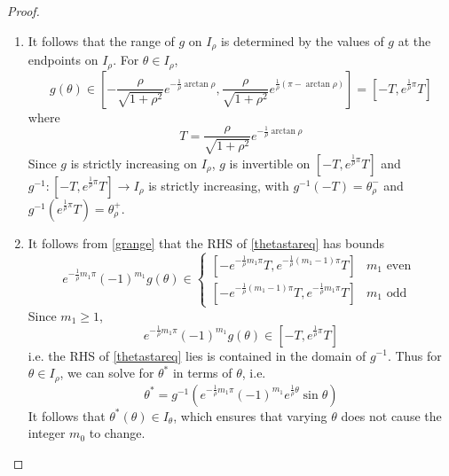 \documentclass[thesis.tex]{subfiles}
\begin{document}
\begin{lemma}
\begin{proof}
\begin{enumerate}
	\item It follows that the range of $g$ on $I_\rho$ is determined by the values of $g$ at the endpoints on $I_\rho$. For $\theta \in I_\rho$,
	\begin{equation}\label{grange}
	g(\theta) \in \left[ -\frac{\rho}{\sqrt{1+\rho^2}}e^{-\frac{1}{\rho}\arctan \rho}, \frac{\rho}{\sqrt{1+\rho^2}}e^{\frac{1}{\rho}(\pi - \arctan \rho)}\right] = [-T, e^{\frac{1}{\rho}\pi} T]
	\end{equation}
	where 
	\begin{equation}\label{defT}
	T = \frac{\rho}{\sqrt{1+\rho^2}}e^{-\frac{1}{\rho}\arctan \rho}
	\end{equation}
	Since $g$ is strictly increasing on $I_\rho$, $g$ is invertible on $[-T, e^{\frac{1}{\rho}\pi} T]$ and $g^{-1}: [-T, e^{\frac{1}{\rho}\pi} T] \rightarrow I_\rho$ is strictly increasing, with $g^{-1}(-T) = \theta_\rho^-$ and $g^{-1}(e^{\frac{1}{\rho}\pi} T) = \theta_\rho^+$.

	\item It follows from \eqref{grange} that the RHS of \eqref{thetastareq} has bounds
	\begin{equation}\label{RHSbounds}
	e^{ -\frac{1}{\rho} m_1 \pi } (-1)^{m_1} g(\theta) \in
	\begin{cases}
	[-e^{-\frac{1}{\rho}m_1 \pi} T, e^{-\frac{1}{\rho}(m_1 - 1) \pi} T] & m_1 \text{ even }\\
	[-e^{-\frac{1}{\rho}(m_1 - 1) \pi} T, e^{-\frac{1}{\rho}m_1 \pi} T] & m_1 \text{ odd }
	\end{cases}
	\end{equation}
	Since $m_1 \geq 1$, 
	\begin{equation*}
	e^{ -\frac{1}{\rho} m_1 \pi } (-1)^{m_1} g(\theta) \in [-T, e^{\frac{1}{\rho}\pi} T]
	\end{equation*}
	i.e. the RHS of \eqref{thetastareq} lies is contained in the domain of $g^{-1}$. Thus for $\theta \in I_\rho$, we can solve for $\theta^*$ in terms of $\theta$, i.e. 
	\begin{equation}\label{solvethetastar}
	\theta^* = g^{-1}\left( e^{ -\frac{1}{\rho} m_1 \pi } (-1)^{m_1}  e^{ \frac{1}{\rho} \theta } \sin \theta \right)
	\end{equation}
	It follows that $\theta^*(\theta) \in I_\theta$, which ensures that varying $\theta$ does not cause the integer $m_0$ to change.


\end{enumerate}
\end{proof}
\end{lemma}
\end{document}
